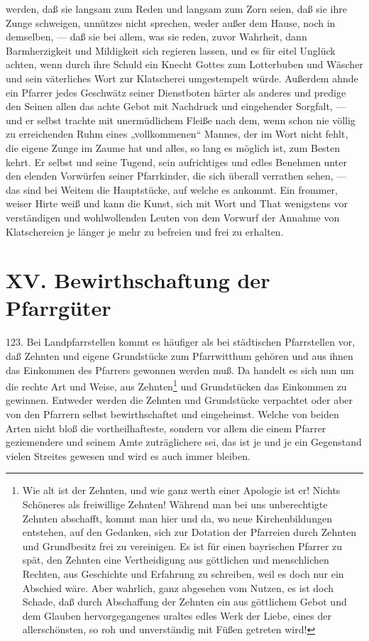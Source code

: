 werden, daß sie langsam zum Reden und langsam zum Zorn seien, daß sie ihre Zunge schweigen, unnützes nicht sprechen, weder außer dem Hause, noch in demselben, — daß sie bei allem, was sie reden, zuvor Wahrheit, dann Barmherzigkeit und Mildigkeit sich regieren lassen, und es für eitel Unglück achten, wenn durch ihre Schuld ein Knecht Gottes zum Lotterbuben und Wäscher und sein väterliches Wort zur Klatscherei umgestempelt würde. Außerdem ahnde ein Pfarrer jedes Geschwätz seiner Dienstboten härter als anderes und predige den Seinen allen das achte Gebot mit Nachdruck und eingehender Sorgfalt, — und er selbst trachte mit unermüdlichem Fleiße nach dem, wenn schon nie völlig zu erreichenden Ruhm eines „vollkommenen“ Mannes, der im Wort nicht fehlt, die eigene Zunge im Zaume hat und alles, so lang es möglich ist, zum Besten kehrt. Er selbst und seine Tugend, sein aufrichtiges und edles Benehmen unter den elenden Vorwürfen seiner Pfarrkinder, die sich überall verrathen sehen, — das sind bei Weitem die Hauptstücke, auf welche es ankommt. Ein frommer, weiser Hirte weiß und kann die Kunst, sich mit Wort und That wenigstens vor verständigen und wohlwollenden Leuten von dem Vorwurf der Annahme von Klatschereien je länger je mehr zu befreien und frei zu erhalten.

\section{XV. Bewirthschaftung der Pfarrgüter}

123. Bei Landpfarrstellen kommt es häufiger als bei städtischen Pfarrstellen vor, daß Zehnten und eigene Grundstücke zum Pfarrwitthum gehören und aus ihnen das Einkommen des Pfarrers gewonnen werden muß. Da handelt es sich nun um die rechte Art und Weise, aus Zehnten\footnote{Wie alt ist der Zehnten, und wie ganz werth einer Apologie ist er! Nichts Schöneres als freiwillige Zehnten! Während man bei uns unberechtigte Zehnten abschafft, kommt man hier und da, wo neue Kirchenbildungen entstehen, auf den Gedanken, sich zur Dotation der Pfarreien durch Zehnten und Grundbesitz frei zu vereinigen. Es ist für einen bayrischen Pfarrer zu spät, den Zehnten eine Vertheidigung aus göttlichen und menschlichen Rechten, aus Geschichte und Erfahrung zu schreiben, weil es doch nur ein Abschied wäre. Aber wahrlich, ganz abgesehen vom Nutzen, es ist doch Schade, daß durch Abschaffung der Zehnten ein aus göttlichem Gebot und dem Glauben hervorgegangenes uraltes edles Werk der Liebe, eines der allerschönsten, so roh und unverständig mit Füßen getreten wird!} und Grundstücken das Einkommen zu gewinnen. Entweder werden die Zehnten und Grundstücke verpachtet oder aber von den Pfarrern selbst bewirthschaftet und eingeheimst. Welche von beiden Arten nicht bloß die vortheilhafteste, sondern vor allem die einem Pfarrer geziemendere und seinem Amte zuträglichere sei, das ist je und je ein Gegenstand vielen Streites gewesen und wird es auch immer bleiben.

